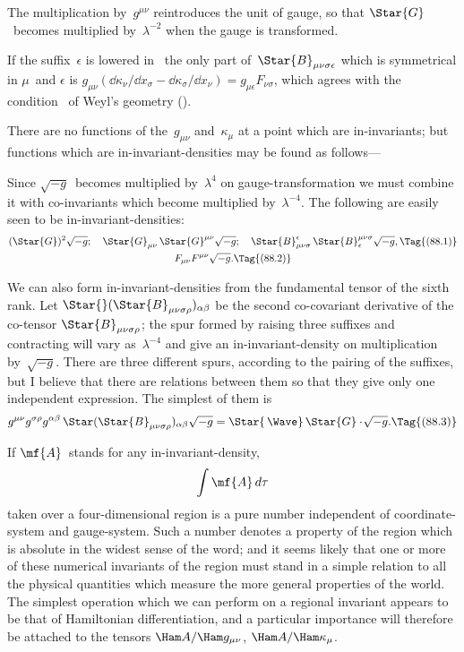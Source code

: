 \documentclass[12pt]{book}
\begin{document}
The multiplication by~$g^{\mu\nu}$ reintroduces the unit of gauge, so that $\Star{G}$~becomes
multiplied by~$\lambda^{-2}$ when the gauge is transformed.

If the suffix~$\epsilon$ is lowered in~ the only part of~$\Star{B}_{\mu\nu\sigma\epsilon}$ which is symmetrical
in $\mu$~and $\epsilon$ is $g_{\mu\nu} (\dd\kappa_{\nu}/\dd x_{\sigma} - \dd\kappa_{\sigma}/\dd x_{\nu}) = g_{\mu\epsilon} F_{\nu\sigma}$, which agrees with the
condition~ of Weyl's geometry ().

%

There are no functions of the~$g_{\mu\nu}$ and~$\kappa_{\mu}$ at a point which are in-invariants;
but functions which are in-invariant-densities may be found as
follows---

Since $\sqrt{-g}$~becomes multiplied by~$\lambda^{4}$ on gauge-transformation we must
combine it with co-invariants which become multiplied by~$\lambda^{-4}$. The following
are easily seen to be in-invariant-densities:
\begin{gather*}
  (\Star{G})^{2} \sqrt{-g};\quad
  \Star{G}_{\mu\nu}\, \Star{G}^{\mu\nu} \sqrt{-g};\quad
  \Star{B}_{\mu\nu\sigma}^{\epsilon}\, \Star{B}_{\epsilon}^{\mu\nu\sigma} \sqrt{-g},
  \Tag{(88.1)} \\
  F_{\mu\nu} F^{\mu\nu} \sqrt{-g}.
  \Tag{(88.2)}
\end{gather*}

We can also form in-invariant-densities from the fundamental tensor of
the sixth rank. Let $\Star{}(\Star{B}_{\mu\nu\sigma\rho})_{\alpha\beta}$ be the second co-covariant derivative of the
co-tensor $\Star{B}_{\mu\nu\sigma\rho}$; the spur formed by raising three suffixes and contracting
will vary as~$\lambda^{-4}$ and give an in-invariant-density on multiplication by~$\sqrt{-g}$.
%
There are three different spurs, according to the pairing of the suffixes, but
I believe that there are relations between them so that they give only one
independent expression. The simplest of them is
\[
g^{\mu\nu} g^{\sigma\rho} g^{\alpha\beta}\, \Star(\Star{B}_{\mu\nu\sigma\rho})_{\alpha\beta} \sqrt{-g}
= \Star{\,\Wave}\, \Star{G} \cdot \!\sqrt{-g}.
\Tag{(88.3)}
\]

If $\mf{A}$~stands for any in-invariant-density,
%
\[
\int \mf{A}\, d\tau
\]
taken over a four-dimensional region is a pure number independent of coordinate-system
and gauge-system. Such a number denotes a property of
the region which is absolute in the widest sense of the word; and it seems
likely that one or more of these numerical invariants of the region must
stand in a simple relation to all the physical quantities which measure the
more general properties of the world. The simplest operation which we can
perform on a regional invariant appears to be that of Hamiltonian differentiation,
and a particular importance will therefore be attached to the tensors
$\Ham A/\Ham g_{\mu\nu}$, $\Ham A/\Ham\kappa_{\mu}$.
\end{document}
